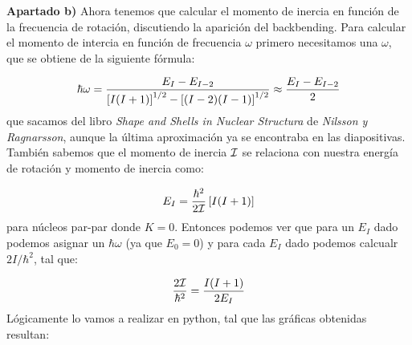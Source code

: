 \begin{texercise}
    \textbf{Apartado b)} Ahora tenemos que calcular el momento de inercia en función de la frecuencia de rotación, discutiendo la aparición del backbending. Para calcular el momento de intercia en función de frecuencia $\omega$ primero necesitamos una $\omega$, que se obtiene de la siguiente fórmula:

    \begin{equation}
        \hbar \omega =  \frac{E_{I}-E_{I-2}}{\left[ I(I+1) \right]^{1/2}-\left[ (I-2)(I-1) \right]^{1/2}} \approx \frac{E_I-E_{I-2}}{2}
    \end{equation}
    que sacamos del libro \textit{Shape and Shells in Nuclear Structura} de \textit{Nilsson y Ragnarsson}, aunque la última aproximación ya se encontraba en las diapositivas. También sabemos que el momento de inercia $\mathcal{I}$ se relaciona con nuestra energía de rotación  y momento de inercia como:

    \begin{equation}
        E_{I} = \frac{\hbar^2}{2\mathcal{I}} \left[ I(I+1) \right]
    \end{equation}
    para núcleos par-par donde $K=0$. Entonces podemos ver que para un $E_I$ dado podemos asignar un $\hbar \omega$ (ya que $E_0=0$) y para cada $E_I$ dado podemos calcualr $2I/\hbar^2$, tal que:
    
    \begin{equation}
       \frac{2\mathcal{I}}{\hbar^2} = \frac{I(I+1)}{2E_I}
    \end{equation}
    Lógicamente lo vamos a realizar en python, tal que las gráficas obtenidas resultan:


\end{texercise}
